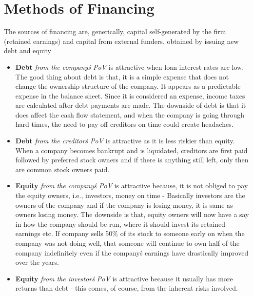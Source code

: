 \section{Methods of Financing}
The sources of financing are, generically, capital self-generated by the firm (retained earnings) and capital from external funders, obtained by issuing new debt and equity
	\begin{itemize}
	\item \textbf{Debt} \textit{from the company\'s PoV} is attractive when loan interest rates are low. The good thing about debt is that, it is a simple expense that does not change the ownership structure of the company. It appears as a predictable expense in the balance sheet. Since it is considered an expense, income taxes are calculated after debt payments are made. The downside of debt is that it does affect the cash flow statement, and when the company is going through hard times, the need to pay off creditors on time could create headaches. 
	\item \textbf{Debt} \textit{from the creditor\'s PoV} is attractive as it is less riskier than equity. When a company becomes bankrupt and is liquidated, creditors are first paid followed by preferred stock owners and if there is anything still left, only then are common stock owners paid. 
	\item \textbf{Equity} \textit{from the company\'s PoV} is attractive because, it is not obliged to pay the equity owners, i.e., investors, money on time - Basically investors are the owners of the company and if the company is losing money, it is same as owners losing money. The downside is that, equity owners will now have a say in how the company should be run, where it should invest its retained earnings etc. If company sells 50\% of its stock to someone early on when the company was not doing well, that someone will continue to own half of the company indefinitely even if the company\'s earnings have drastically improved over the years.
	\item \textbf{Equity} \textit{from the investor\'s PoV} is attractive because it usually has more returns than debt - this comes, of course, from the inherent risks involved. 
	\end{itemize}	
